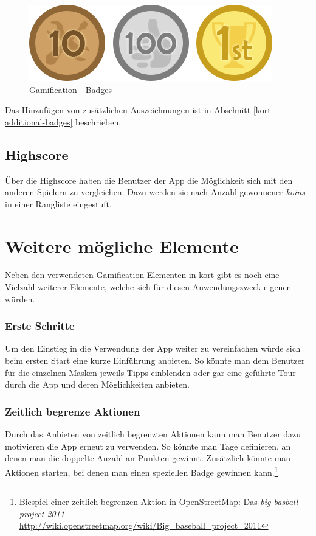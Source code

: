 \begin{figure}[H]
	\centering
	\includegraphics[scale=0.7]{images/gamification/gamification-badges}
	\caption{Gamification - Badges}
	\label{gamification-badges}
\end{figure}

Das Hinzufügen von zusätzlichen Auszeichnungen ist in Abschnitt \ref{kort-additional-badges} beschrieben.

\subsection{Highscore}
Über die Highscore haben die Benutzer der App die Möglichkeit sich mit den anderen Spielern zu vergleichen. Dazu werden sie nach Anzahl gewonnener \emph{koins} in einer Rangliste eingestuft.

\section{Weitere mögliche Elemente}
Neben den verwendeten Gamification-Elementen in kort gibt es noch eine Vielzahl weiterer Elemente, welche sich für diesen Anwendungszweck eigenen würden.

\subsubsection{Erste Schritte}
Um den Einstieg in die Verwendung der App weiter zu vereinfachen würde sich beim ersten Start eine kurze Einführung anbieten. So könnte man dem Benutzer für die einzelnen Masken jeweils Tipps einblenden oder gar eine geführte Tour durch die App und deren Möglichkeiten anbieten.

\subsubsection{Zeitlich begrenze Aktionen}
Durch das Anbieten von zeitlich begrenzten Aktionen kann man Benutzer dazu motivieren die App erneut zu verwenden.
So könnte man Tage definieren, an denen man die doppelte Anzahl an Punkten gewinnt.
Zusätzlich könnte man Aktionen starten, bei denen man einen speziellen Badge gewinnen kann.\footnote{Biespiel einer zeitlich begrenzen Aktion in OpenStreetMap: Das \emph{big basball project 2011} \url{http://wiki.openstreetmap.org/wiki/Big_baseball_project_2011}}

